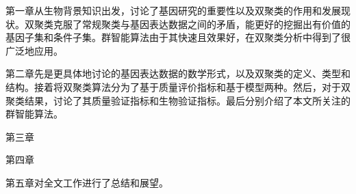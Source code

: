     第一章从生物背景知识出发，讨论了基因研究的重要性以及双聚类的作用和发展现状。双聚类克服了常规聚类与基因表达数据之间的矛盾，能更好的挖掘出有价值的基因子集和条件子集。群智能算法由于其快速且效果好，在双聚类分析中得到了很广泛地应用。

    第二章先是更具体地讨论的基因表达数据的数学形式，以及双聚类的定义、类型和结构。接着将双聚类算法分为了基于质量评价指标和基于模型两种。然后，对于双聚类结果，讨论了其质量验证指标和生物验证指标。最后分别介绍了本文所关注的群智能算法。

    第三章

    第四章
    
    第五章对全文工作进行了总结和展望。
